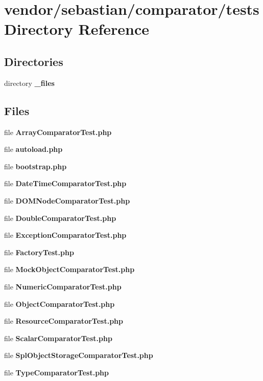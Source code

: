 \section{vendor/sebastian/comparator/tests Directory Reference}
\label{dir_9ea214467dcb8dcd1b0984f8f706c533}
\subsection*{Directories}
\begin{DoxyCompactItemize}
\item 
directory {\bf \+\_\+files}
\end{DoxyCompactItemize}
\subsection*{Files}
\begin{DoxyCompactItemize}
\item 
file {\bf Array\+Comparator\+Test.\+php}
\item 
file {\bf autoload.\+php}
\item 
file {\bf bootstrap.\+php}
\item 
file {\bf Date\+Time\+Comparator\+Test.\+php}
\item 
file {\bf D\+O\+M\+Node\+Comparator\+Test.\+php}
\item 
file {\bf Double\+Comparator\+Test.\+php}
\item 
file {\bf Exception\+Comparator\+Test.\+php}
\item 
file {\bf Factory\+Test.\+php}
\item 
file {\bf Mock\+Object\+Comparator\+Test.\+php}
\item 
file {\bf Numeric\+Comparator\+Test.\+php}
\item 
file {\bf Object\+Comparator\+Test.\+php}
\item 
file {\bf Resource\+Comparator\+Test.\+php}
\item 
file {\bf Scalar\+Comparator\+Test.\+php}
\item 
file {\bf Spl\+Object\+Storage\+Comparator\+Test.\+php}
\item 
file {\bf Type\+Comparator\+Test.\+php}
\end{DoxyCompactItemize}
